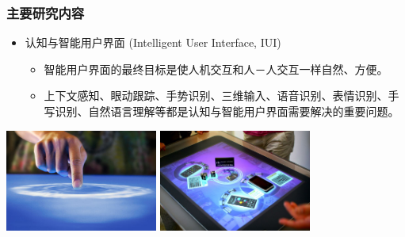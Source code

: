 \documentclass{beamer}
\begin{document}
\begin{frame}
	\frametitle{主要研究内容}
	\begin{itemize}
		\item 认知与智能用户界面 (Intelligent User Interface, IUI)
		\begin{itemize}
			\item 智能用户界面的最终目标是使人机交互和人－人交互一样自然、方便。
			\item 上下文感知、眼动跟踪、手势识别、三维输入、语音识别、表情识别、手写识别、自然语言理解等都是认知与智能用户界面需要解决的重要问题。
		\end{itemize}
	\end{itemize}
	\begin{center}
		\includegraphics[width=5cm]{images/surface1.jpg}
		\includegraphics[width=5cm]{images/surface2.jpg}
	\end{center}
\end{frame}
\end{document}
